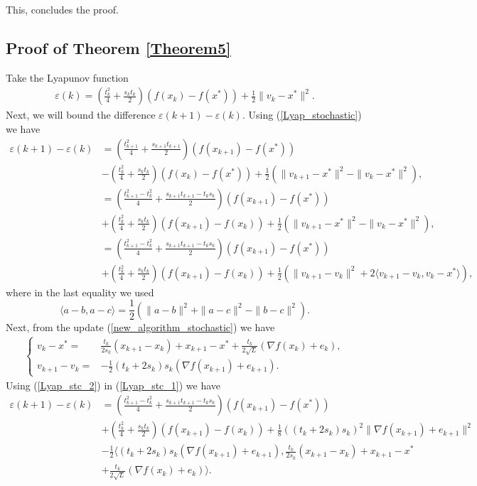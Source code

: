 \documentclass{article}
\theoremstyle{plain}
\theoremstyle{definition}
\theoremstyle{remark}
\begin{document}
This, concludes the proof.
\subsection{Proof of Theorem \ref{Theorem5}}\label{thm6_proof}
Take the Lyapunov function
    \begin{align}\label{Lyap_stochastic}
    \varepsilon(k)= (\frac{t_k^2}{4}+\frac{s_kt_k}{2})(f(x_k)-f(x^*))+\frac{1}{2}\|v_k-x^*\|^2.
    \end{align}
    Next, we will bound the difference $\varepsilon(k+1)-\varepsilon(k)$. Using (\ref{Lyap_stochastic}) we have
    \begin{align}\label{Lyap_stc_1}
        \varepsilon(k+1)-\varepsilon(k)&=(\frac{t_{k+1}^2}{4}+\frac{s_{k+1}t_{k+1}}{2})(f(x_{k+1})-f(x^*))\nonumber\\
        &-(\frac{t_{k}^2}{4}+\frac{s_{k}t_{k}}{2})(f(x_{k})-f(x^*))+\frac{1}{2}(\|v_{k+1}-x^*\|^2-\|v_{k}-x^*\|^2),\nonumber\\
        & = (\frac{t_{k+1}^2-t_k^2}{4}+\frac{s_{k+1}t_{k+1}-t_ks_k}{2})(f(x_{k+1})-f(x^*))\nonumber\\
        &+(\frac{t_{k}^2}{4}+\frac{s_{k}t_{k}}{2})(f(x_{k+1})-f(x_k))+\frac{1}{2}(\|v_{k+1}-x^*\|^2-\|v_{k}-x^*\|^2),\nonumber\\
        &= (\frac{t_{k+1}^2-t_k^2}{4}+\frac{s_{k+1}t_{k+1}-t_ks_k}{2})(f(x_{k+1})-f(x^*))\nonumber\\
        &+(\frac{t_{k}^2}{4}+\frac{s_{k}t_{k}}{2})(f(x_{k+1})-f(x_k))+\frac{1}{2}(\|v_{k+1}-v_k\|^2+2\langle v_{k+1}-v_k,v_k-x^*\rangle),
    \end{align}
    where in the last equality we used 
    $$\langle a-b,a-c\rangle = \frac{1}{2}(\|a-b\|^2+\|a-c\|^2-\|b-c\|^2).$$
    Next, from the update (\ref{new_algorithm_stochastic}) we have
    \begin{align}\label{Lyap_stc_2}
        \left\{\begin{array}{cl}
             v_k-x^*=&\frac{t_k}{2s_k}(x_{k+1}-x_k)+x_{k+1}-x^*+\frac{t_k}{2\sqrt{L}}(\nabla f(x_k)+e_k),  \\
            v_{k+1}-v_k=& -\frac{1}{2}(t_k+2s_k)s_k (\nabla f(x_{k+1})+e_{k+1}).
        \end{array}\right.
    \end{align}
    Using (\ref{Lyap_stc_2}) in (\ref{Lyap_stc_1}) we have
    \begin{align}\label{Lyap_stc_3}
        \varepsilon(k+1)-\varepsilon(k)&=(\frac{t_{k+1}^2-t_k^2}{4}+\frac{s_{k+1}t_{k+1}-t_ks_k}{2})(f(x_{k+1})-f(x^*))\nonumber\\
        &+(\frac{t_{k}^2}{4}+\frac{s_{k}t_{k}}{2})(f(x_{k+1})-f(x_k))+\frac{1}{8}((t_k+2s_k)s_k)^2\|\nabla f(x_{k+1})+e_{k+1}\|^2\nonumber\\
        &-\frac{1}{2}\langle (t_k+2s_k)s_k (\nabla f(x_{k+1})+e_{k+1}), \frac{t_k}{2s_k}(x_{k+1}-x_k)+x_{k+1}-x^*\nonumber\\
        &+\frac{t_k}{2\sqrt{L}}(\nabla f(x_k)+e_k)\rangle.
    \end{align}
\end{document}
